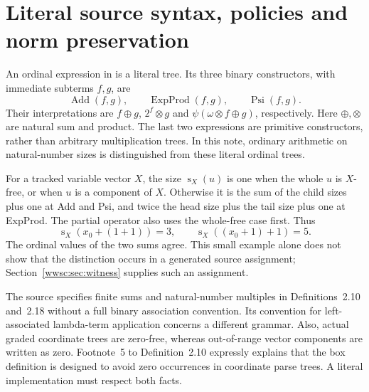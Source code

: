 \begingroup
\newcommand{\WWscNat}{\mathbb N}
\newcommand{\WWscLevel}{\operatorname{lv}}
\newcommand{\WWscNorm}{\operatorname{N}}
\newcommand{\WWscSize}{\operatorname{s}}
\newcommand{\WWscAdd}{\operatorname{Add}}
\newcommand{\WWscExp}{\operatorname{ExpProd}}
\newcommand{\WWscPsi}{\operatorname{Psi}}
\newcommand{\WWscRepeat}{\operatorname{Repeat}}
\newcommand{\WWscOne}{\mathbf1}
\newcommand{\WWscPartial}{\partial}
\section{Literal source syntax, policies and norm preservation}\label{app:wwsc}\label{app:source-syntax}


An ordinal expression in \cite[Definition~2.1]{ww} is a literal tree. Its
three binary constructors, with immediate subterms $f,g$, are
\[
 \WWscAdd(f,g),\qquad \WWscExp(f,g),\qquad \WWscPsi(f,g).
\]
Their interpretations are $f\oplus g$, $2^f\otimes g$ and
$\psi(\omega\otimes f\oplus g)$, respectively. Here $\oplus,\otimes$
are natural sum and product. The last two expressions are primitive
constructors, rather than arbitrary multiplication trees. In this note,
ordinary arithmetic on natural-number sizes is distinguished from these
literal ordinal trees.

For a tracked variable vector $X$, the size $\WWscSize_X(u)$ is one when the
whole $u$ is $X$-free, or when $u$ is a component of $X$. Otherwise it is
the sum of the child sizes plus one at Add and Psi, and twice the head
size plus the tail size plus one at ExpProd. The partial operator also
uses the whole-free case first. Thus
\[
 \WWscSize_X(x_0+(1+1))=3,\qquad
 \WWscSize_X((x_0+1)+1)=5.
\]
The ordinal values of the two sums agree. This small example alone does
not show that the distinction occurs in a generated source assignment;
Section~\ref{wwsc:sec:witness} supplies such an assignment.

The source specifies finite sums and natural-number multiples in
Definitions~2.10 and~2.18 without a full binary association convention.
Its convention for left-associated lambda-term application concerns a
different grammar. Also, actual graded coordinate trees are zero-free,
whereas out-of-range vector components are written as zero. Footnote~5
to Definition~2.10 expressly explains that the box definition is designed
to avoid zero occurrences in coordinate parse trees. A literal
implementation must respect both facts.

